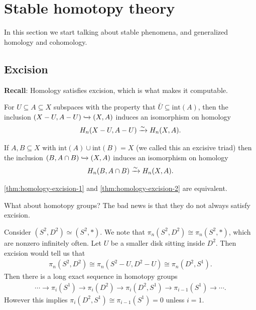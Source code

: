 \documentclass{article}[11pt]
\begin{document}
\section{Stable homotopy theory}
In this section we start talking about stable phenomena, and generalized homology and cohomology. 

\subsection{Excision}

\textbf{Recall}: Homology satisfies excision, which is what makes it computable.

\begin{theorem}\label{thm:homology-excision-1} For $U\subseteq A\subseteq X$ subspaces with the property that $\bar{U} \subseteq \mathrm{int}(A)$, then the inclusion $(X - U, A - U) \xhookrightarrow{} (X,A)$ induces an isomorphism on homology
\begin{align*}
	H_n(X-U, A-U) \xrightarrow{\sim} H_n(X,A).
\end{align*}
\end{theorem}

\begin{theorem}\label{thm:homology-excision-2} If $A,B\subseteq X$ with $\mathrm{int}(A) \cup \mathrm{int}(B) = X$ (we called this an excisive triad) then the inclusion $(B, A\cap B) \xhookrightarrow{} (X,A)$ induces an isomorphism on homology
\begin{align*}
	H_n(B, A\cap B) \xrightarrow{\sim} H_n(X,A).
\end{align*}
\end{theorem}

\begin{exercise}  \autoref{thm:homology-excision-1} and \autoref{thm:homology-excision-2} are equivalent.
\end{exercise}

What about homotopy groups? The bad news is that they do not always satisfy excision.

\begin{counterexample} Consider $(S^2,D^2)\simeq (S^2, \ast)$. We note that $\pi_n(S^2, D^2) \cong \pi_n(S^2,\ast)$, which are nonzero infinitely often. Let $U$ be a smaller disk sitting inside $D^2$. Then excision would tell us that
\begin{align*}
	\pi_n(S^2, D^2) \cong \pi_n(S^2-U, D^2-U) \cong \pi_n(D^2, S^1).
\end{align*}
Then there is a long exact sequence in homotopy groups
\begin{align*}
	\cdots \to \pi_i(S^1) \to \pi_i(D^2) \to \pi_i(D^2, S^1) \to \pi_{i-1}(S^1) \to \cdots.
\end{align*}
However this implies $\pi_i (D^2, S^1) \cong \pi_{i-1}(S^1) = 0$ unless $i=1$.
\end{counterexample}
\end{document}
